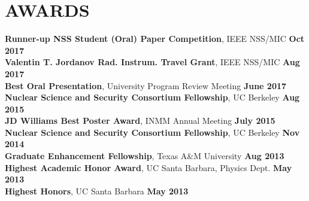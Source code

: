 \section{\small{AWARDS}}

{\bf Runner-up NSS Student (Oral) Paper Competition}, IEEE NSS/MIC \hfill {\bf Oct 2017}\\
{\bf Valentin T. Jordanov Rad. Instrum. Travel Grant}, IEEE NSS/MIC \hfill {\bf Aug 2017}\\
{\bf Best Oral Presentation}, University Program Review Meeting \hfill {\bf June 2017}\\
{\bf Nuclear Science and Security Consortium Fellowship}, UC Berkeley \hfill {\bf Aug 2015}\\
{\bf JD Williams Best Poster Award}, INMM Annual Meeting \hfill {\bf July 2015}\\
{\bf Nuclear Science and Security Consortium Fellowship}, UC Berkeley \hfill {\bf Nov 2014}\\
{\bf Graduate Enhancement Fellowship}, Texas A\&M University \hfill {\bf Aug 2013}\\
{\bf Highest Academic Honor Award}, UC Santa Barbara, Physics Dept. \hfill {\bf May 2013}\\
{\bf Highest Honors}, UC Santa Barbara \hfill {\bf May 2013}


